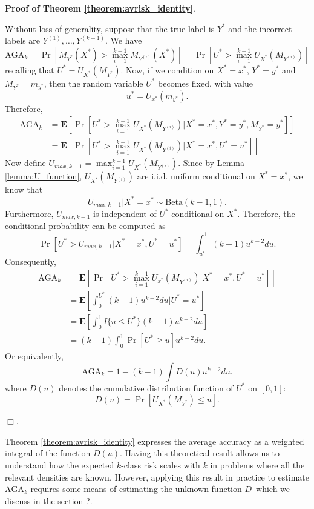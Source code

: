 \documentclass[twoside,11pt]{article}
\newcommand{\E}{\textbf{E}}
\begin{document}
\noindent\textbf{Proof of Theorem \ref{theorem:avrisk_identity}}.

Without loss of generality, suppose that the true label is $Y^*$ and
the incorrect labels are $Y^{(1)},\hdots, Y^{(k-1)}$.  We have
\[
\text{AGA}_k = \Pr[M_{Y^*}(X^*) > \max_{i=1}^{k-1} M_{Y^{(i)}}(X^*)]
= \Pr[U^* > \max_{i=1}^{k-1} U_{X^*}(M_{Y^{(i)}})]
\]
recalling that $U^* = U_{X^*}(M_{Y^*})$.  Now, if we condition on $X^*
= x^*$, $Y^* = y^*$ and $M_{Y^*} = m_{y^*}$, then the random variable
$U^*$ becomes fixed, with value
\[
u^* = U_{x^*}(m_{y^*}).
\]
Therefore,
\begin{align*}
\text{AGA}_k &=\E[\Pr[U^* > \max_{i=1}^{k-1} U_{X^*}(M_{Y^{(i)}})|X^* = x^*, Y^* = y^*, M_{Y^*} = y^*]]
\\&= \E[\Pr[U^* > \max_{i=1}^{k-1} U_{X^*}(M_{Y^{(i)}})|X^* = x^*, U^* = u^*]]
\end{align*}
Now define $U_{max, k-1} = \max_{i=1}^{k-1} U_{X^*}(M_{Y^{(i)}})$. 
Since by Lemma \ref{lemma:U_function},
$U_{X^*}(M_{Y^{(i)}})$ are i.i.d. uniform conditional on $X^* = x^*$, we know that
\begin{equation}\label{eq:umax_beta}
U_{max, k-1}|X^* = x^* \sim \text{Beta}(k-1, 1). 
\end{equation}
Furthermore, $U_{max, k-1}$ is independent of $U^*$ conditional on
$X^*$.  Therefore, the conditional probability can be computed as
\[
\Pr[U^* > U_{max, k-1}|X^* = x^*, U^* = u^*] = \int_{u^*}^1 (k-1) u^{k-2} du.
\]
Consequently,
\begin{align*}
\text{AGA}_k &= \E[\Pr[U^* > \max_{i=1}^{k-1} U_{x^*}(M_{Y^{(i)}})|X^* = x^*, U^* = u^*]]
\\&= \E[\int_0^{U^*} (k-1) u^{k-2} du|U^* = u^*]
\\&= \E[\int_0^1 I\{u \leq U^*\} (k-1) u^{k-2} du ]
\\&= (k-1) \int_0^1 \Pr[U^* \geq u] u^{k-2} du.
\end{align*}
Or equivalently,
\[
\text{AGA}_k = 1 - (k-1) \int {D}(u) u^{k-2} du.
\]
where ${D}(u)$ denotes the cumulative distribution function of
$U^*$ on $[0,1]$:
\begin{equation}\label{eq:Kbar}
{D}(u) = \Pr[U_{X^*}(M_{Y^*}) \leq u].
\end{equation}

$\Box$.


Theorem \ref{theorem:avrisk_identity} expresses the average accuracy
as a weighted integral of the function ${D}(u)$.  Having this
theoretical result allows us to understand how the expected $k$-class
risk scales with $k$ in problems where all the relevant densities are
known.  However, applying this result in practice to estimate
$\text{AGA}_k$ requires some means of estimating the unknown function
${D}$--which we discuss in the section ?.
\end{document}
